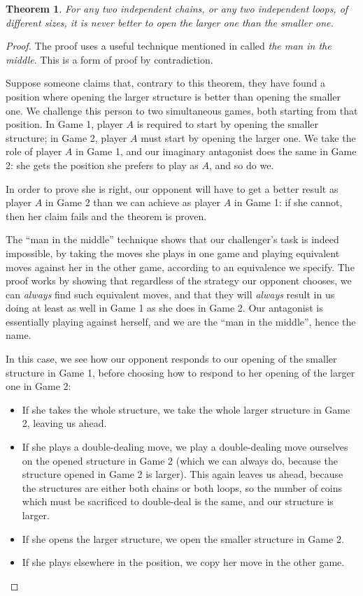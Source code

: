 \documentclass[a4paper,twocolumn]{article}
\newtheorem{opensmallest}[thm]{Theorem}
\begin{document}
\begin{opensmallest}\label{opensmallest}
  For any two independent chains, or any two independent loops, of
  different sizes, it is never better to open the larger one than the
  smaller one.
\end{opensmallest}
\begin{proof}
  The proof uses a useful technique mentioned in \cite{berl} called
  \emph{the man in the middle}. This is a form of proof by
  contradiction.

  Suppose someone claims that, contrary to this theorem, they have
  found a position where opening the larger structure is better than
  opening the smaller one. We challenge this person to two
  simultaneous games, both starting from that position. In Game 1,
  player $A$ is required to start by opening the smaller structure; in
  Game 2, player $A$ must start by opening the larger one. We take the
  role of player $A$ in Game 1, and our imaginary antagonist does the
  same in Game 2: she gets the position she prefers to play as $A$,
  and so do we.

  In order to prove she is right, our opponent will have to get a
  better result as player $A$ in Game 2 than we can achieve as player
  $A$ in Game 1: if she cannot, then her claim fails and the theorem
  is proven.

  The ``man in the middle'' technique shows that our challenger's task
  is indeed impossible, by taking the moves she plays in one game and
  playing equivalent moves against her in the other game, according to
  an equivalence we specify. The proof works by showing that
  regardless of the strategy our opponent chooses, we can
  \emph{always} find such equivalent moves, and that they will
  \emph{always} result in us doing at least as well in Game 1 as she
  does in Game 2. Our antagonist is essentially playing against
  herself, and we are the ``man in the middle'', hence the name.

  In this case, we see how our opponent responds to our opening of the
  smaller structure in Game 1, before choosing how to respond to her
  opening of the larger one in Game 2:

  \begin{itemize}
  \item If she takes the whole structure, we take the whole larger
    structure in Game 2, leaving us ahead.
  \item If she plays a double-dealing move, we play a double-dealing
    move ourselves on the opened structure in Game 2 (which we can
    always do, because the structure opened in Game 2 is larger). This
    again leaves us ahead, because the structures are either both
    chains or both loops, so the number of coins which must be
    sacrificed to double-deal is the same, and our structure is
    larger.
  \item If she opens the larger structure, we open the smaller
    structure in Game 2.
  \item If she plays elsewhere in the position, we copy her move in
    the other game.
  \end{itemize}


\end{proof}
\end{document}
